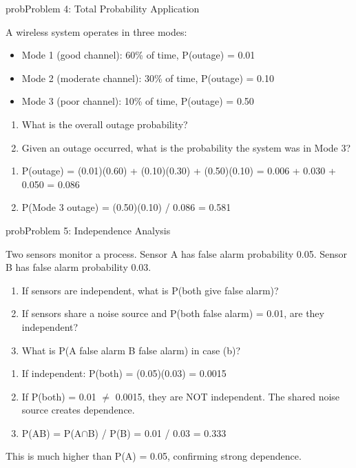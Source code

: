 \begin{PSbox}[unbreakable]{prob}{Problem 4: Total Probability Application}

A wireless system operates in three modes:

\begin{itemize}
\tightlist
\item
  Mode 1 (good channel): 60\% of time, P(outage) = 0.01
\item
  Mode 2 (moderate channel): 30\% of time, P(outage) = 0.10
\item
  Mode 3 (poor channel): 10\% of time, P(outage) = 0.50
\end{itemize}

\begin{enumerate}
\def\labelenumi{(\alph{enumi})}
\tightlist
\item
  What is the overall outage probability?
\item
  Given an outage occurred, what is the probability the system was in Mode 3?
\end{enumerate}

\PSsolution{} 

\begin{enumerate}
\def\labelenumi{(\alph{enumi})}
\item
  P(outage) = (0.01)(0.60) + (0.10)(0.30) + (0.50)(0.10) = 0.006 + 0.030 + 0.050 = 0.086
\item
  P(Mode 3 \textbar{} outage) = (0.50)(0.10) / 0.086 = 0.581
\end{enumerate}

\end{PSbox}

\begin{PSbox}[unbreakable]{prob}{Problem 5: Independence Analysis}

Two sensors monitor a process. Sensor A has false alarm probability 0.05. Sensor B has false alarm probability 0.03.

\begin{enumerate}
\def\labelenumi{(\alph{enumi})}
\tightlist
\item
  If sensors are independent, what is P(both give false alarm)?
\item
  If sensors share a noise source and P(both false alarm) = 0.01, are they independent?
\item
  What is P(A false alarm \textbar{} B false alarm) in case (b)?
\end{enumerate}

\PSsolution{} 

\begin{enumerate}
\def\labelenumi{(\alph{enumi})}
\item
  If independent: P(both) = (0.05)(0.03) = 0.0015
\item
  If P(both) = 0.01 \ensuremath{\neq} 0.0015, they are NOT independent. The shared noise source creates dependence.
\item
  P(A\textbar{}B) = P(A\ensuremath{\cap}B) / P(B) = 0.01 / 0.03 = 0.333
\end{enumerate}

This is much higher than P(A) = 0.05, confirming strong dependence.

\end{PSbox}

